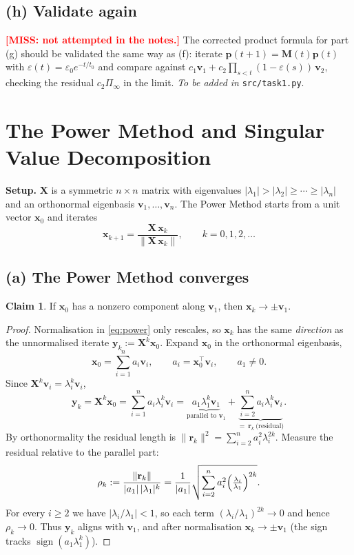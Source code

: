 \documentclass[12pt,a4paper]{article}
\newcommand{\miss}[1]{{\textbf{\textcolor{red}{[MISS: #1]}}}}
\theoremstyle{definition}
\newtheorem*{claim}{Claim}
\newcommand{\Mx}{\mathbf{M}}
\newcommand{\Xb}{\mathbf{X}}
\newcommand{\vv}{\mathbf{v}}
\newcommand{\xx}{\mathbf{x}}
\newcommand{\yy}{\mathbf{y}}
\newcommand{\pp}{\mathbf{p}}
\newcommand{\rr}{\mathbf{r}}
\newcommand{\norm}[1]{\lVert #1 \rVert}
\newcommand{\T}{^{\!\top}}
\begin{document}
\subsection{(h) Validate again}

\miss{not attempted in the notes.} The corrected product formula for part (g)
should be validated the same way as (f): iterate $\pp(t+1)=\Mx(t)\pp(t)$ with
$\varepsilon(t)=\varepsilon_0 e^{-t/t_0}$ and compare against
$c_1\vv_1+c_2\prod_{s<t}(1-\varepsilon(s))\,\vv_2$, checking the residual
$c_2\Pi_\infty$ in the limit. \emph{To be added in} \texttt{src/task1.py}.

\section{The Power Method and Singular Value Decomposition}

\textbf{Setup.} $\Xb$ is a symmetric $n\times n$ matrix with eigenvalues
$|\lambda_1|>|\lambda_2|\ge\cdots\ge|\lambda_n|$ and an orthonormal eigenbasis
$\vv_1,\dots,\vv_n$. The Power Method starts from a unit vector $\xx_0$ and
iterates
\begin{equation}\label{eq:power}
\xx_{k+1}=\frac{\Xb\,\xx_k}{\norm{\Xb\,\xx_k}},\qquad k=0,1,2,\dots
\end{equation}

\subsection{(a) The Power Method converges}

\begin{claim}
If $\xx_0$ has a nonzero component along $\vv_1$, then $\xx_k\to\pm\vv_1$.
\end{claim}
\begin{proof}
Normalisation in \eqref{eq:power} only rescales, so $\xx_k$ has the same
\emph{direction} as the unnormalised iterate
$\yy_k:=\Xb^{k}\xx_0$. Expand $\xx_0$ in the orthonormal eigenbasis,
\[
\xx_0=\sum_{i=1}^{n} a_i\vv_i,\qquad a_i=\xx_0\T\vv_i,\qquad a_1\ne0 .
\]
Since $\Xb^{k}\vv_i=\lambda_i^{k}\vv_i$,
\[
\yy_k=\Xb^{k}\xx_0=\sum_{i=1}^{n} a_i\lambda_i^{k}\vv_i
      =\underbrace{a_1\lambda_1^{k}\vv_1}_{\text{parallel to }\vv_1}
      +\underbrace{\sum_{i=2}^{n} a_i\lambda_i^{k}\vv_i}_{=\ \rr_k\ \text{(residual)}} .
\]
By orthonormality the residual length is
$\norm{\rr_k}^2=\sum_{i=2}^{n} a_i^2\lambda_i^{2k}$. Measure the residual
relative to the parallel part:
\[
\rho_k:=\frac{\norm{\rr_k}}{|a_1|\,|\lambda_1|^{k}}
       =\frac{1}{|a_1|}\sqrt{\sum_{i=2}^{n} a_i^2\Bigl(\tfrac{\lambda_i}{\lambda_1}\Bigr)^{2k}} .
\]
For every $i\ge2$ we have $|\lambda_i/\lambda_1|<1$, so each term
$(\lambda_i/\lambda_1)^{2k}\to0$ and hence $\rho_k\to0$. Thus $\yy_k$ aligns
with $\vv_1$, and after normalisation $\xx_k\to\pm\vv_1$ (the sign tracks
$\operatorname{sign}(a_1\lambda_1^{k})$). \end{proof}
\end{document}
